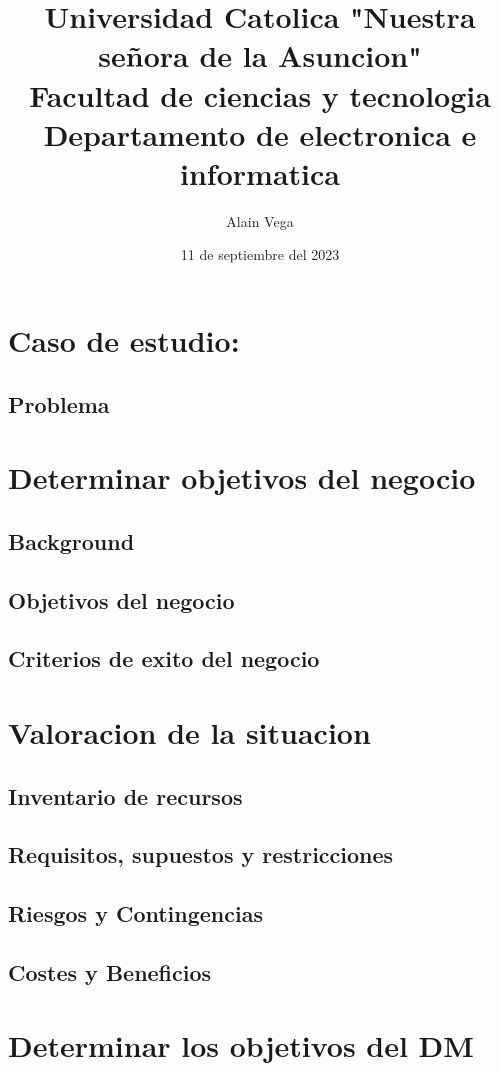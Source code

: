 \documentclass[12pt, letterpaper, spanish]{article}
\title{\textbf{Universidad Catolica "Nuestra señora de la Asuncion" \\ [1ex] \large
Facultad de ciencias y tecnologia \\  Departamento de electronica e informatica}}
\author{Alain Vega}
\date{11 de septiembre del 2023}
\begin{document}
\maketitle

\newpage
\tableofcontents %
\newpage

\section{Caso de estudio: }
\subsection{Problema}
\section{Determinar objetivos del negocio}
\subsection{Background}
\subsection{Objetivos del negocio}
\subsection{Criterios de exito del negocio}
\section{Valoracion de la situacion}
\subsection{Inventario de recursos}
\subsection{Requisitos, supuestos y restricciones}
\subsection{Riesgos y Contingencias}
\subsection{Costes y Beneficios}
\section{Determinar los objetivos del DM}
\end{document}
